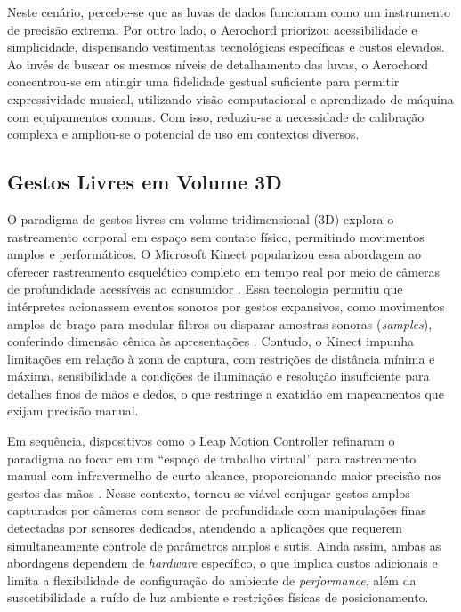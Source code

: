 Neste cenário, percebe-se que as luvas de dados funcionam como um instrumento de precisão extrema. Por outro lado, o Aerochord priorizou acessibilidade e simplicidade, dispensando vestimentas tecnológicas específicas e custos elevados. Ao invés de buscar os mesmos níveis de detalhamento das luvas, o Aerochord concentrou-se em atingir uma fidelidade gestual suficiente para permitir expressividade musical, utilizando visão computacional e aprendizado de máquina com equipamentos comuns. Com isso, reduziu-se a necessidade de calibração complexa e ampliou-se o potencial de uso em contextos diversos.

\subsection{Gestos Livres em Volume 3D}
\label{subsec:gestos_livros_volume_3d}

O paradigma de gestos livres em volume tridimensional (3D) explora o rastreamento corporal em espaço sem contato físico, permitindo movimentos amplos e performáticos. O Microsoft Kinect popularizou essa abordagem ao oferecer rastreamento esquelético completo em tempo real por meio de câmeras de profundidade acessíveis ao consumidor \cite{shotton2011real}. Essa tecnologia permitiu que intérpretes acionassem eventos sonoros por gestos expansivos, como movimentos amplos de braço para modular filtros ou disparar amostras sonoras (\textit{samples}), conferindo dimensão cênica às apresentações \cite{KinectMusic2012}. Contudo, o Kinect impunha limitações em relação à zona de captura, com restrições de distância mínima e máxima, sensibilidade a condições de iluminação e resolução insuficiente para detalhes finos de mãos e dedos, o que restringe a exatidão em mapeamentos que exijam precisão manual.

Em sequência, dispositivos como o Leap Motion Controller refinaram o paradigma ao focar em um “espaço de trabalho virtual” para rastreamento manual com infravermelho de curto alcance, proporcionando maior precisão nos gestos das mãos \cite{rautaray2012vision}. Nesse contexto, tornou-se viável conjugar gestos amplos capturados por câmeras com sensor de profundidade com manipulações finas detectadas por sensores dedicados, atendendo a aplicações que requerem simultaneamente controle de parâmetros amplos e sutis. Ainda assim, ambas as abordagens dependem de \textit{hardware} específico, o que implica custos adicionais e limita a flexibilidade de configuração do ambiente de \textit{performance}, além da suscetibilidade a ruído de luz ambiente e restrições físicas de posicionamento.

